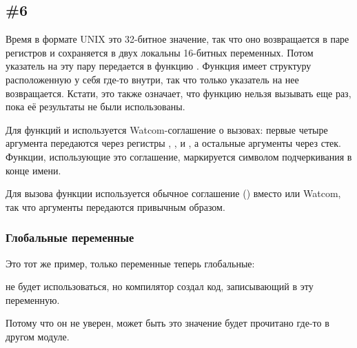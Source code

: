 \subsection{\Example{} \#6}





Время в формате UNIX это 32-битное значение, так что оно возвращается в паре регистров  и сохраняется
в двух локальны 16-битных переменных.
Потом указатель на эту пару передается в функцию
.
Функция  имеет структуру  расположенную у себя
где-то внутри, так что только указатель на нее возвращается. 
Кстати, это также означает, что функцию нельзя вызывать еще раз, пока её результаты не были использованы.

Для функций  и  используется
Watcom-соглашение о вызовах: первые четыре аргумента передаются через регистры
, ,  и , а остальные аргументы через стек.
Функции, использующие это соглашение, маркируется символом подчеркивания в конце имени.

Для вызова функции  используется обычное соглашение  () вместо 
 или Watcom, так что аргументы передаются привычным образом.

\subsubsection{Глобальные переменные}

Это тот же пример, только переменные теперь глобальные:





 не будет использоваться, но компилятор создал код, записывающий в эту переменную.

Потому что он не уверен, может быть это значение будет прочитано где-то в другом модуле.

